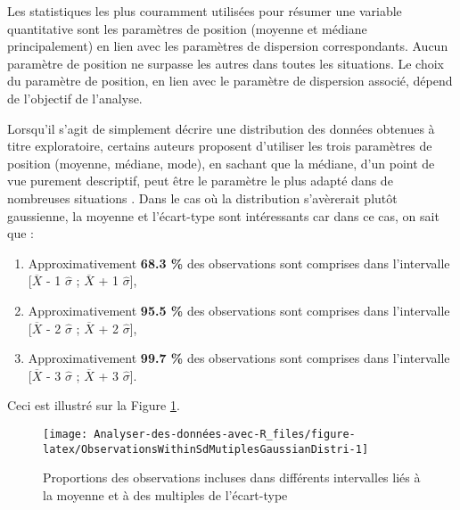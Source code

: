 \documentclass[
  french,
]{book}
\providecommand{\tightlist}{%
  \setlength{\itemsep}{0pt}\setlength{\parskip}{0pt}}
\begin{document}
Les statistiques les plus couramment utilisées pour résumer une variable quantitative sont les paramètres de position (moyenne et médiane principalement) en lien avec les paramètres de dispersion correspondants. Aucun paramètre de position ne surpasse les autres dans toutes les situations. Le choix du paramètre de position, en lien avec le paramètre de dispersion associé, dépend de l'objectif de l'analyse.

Lorsqu'il s'agit de simplement décrire une distribution des données obtenues à titre exploratoire, certains auteurs proposent d'utiliser les trois paramètres de position (moyenne, médiane, mode), en sachant que la médiane, d'un point de vue purement descriptif, peut être le paramètre le plus adapté dans de nombreuses situations \autocite{gonzalesMeasuresCentralTendency2001}. Dans le cas où la distribution s'avèrerait plutôt gaussienne, la moyenne et l'écart-type sont intéressants car dans ce cas, on sait que :

\begin{enumerate}
\def\labelenumi{\arabic{enumi}.}
\tightlist
\item
  Approximativement \textbf{68.3 \%} des observations sont comprises dans l'intervalle {[}\(\overline{X}\) - 1 \(\hat{\sigma}\) ; \(\overline{X}\) + 1 \(\hat{\sigma}\){]},
\item
  Approximativement \textbf{95.5 \%} des observations sont comprises dans l'intervalle {[}\(\overline{X}\) - 2 \(\hat{\sigma}\) ; \(\overline{X}\) + 2 \(\hat{\sigma}\){]},
\item
  Approximativement \textbf{99.7 \%} des observations sont comprises dans l'intervalle {[}\(\overline{X}\) - 3 \(\hat{\sigma}\) ; \(\overline{X}\) + 3 \(\hat{\sigma}\){]}.
\end{enumerate}

Ceci est illustré sur la Figure \ref{fig:ObservationsWithinSdMutiplesGaussianDistri}.

\begin{figure}

{\centering \texttt{[image: Analyser-des-données-avec-R\_files/figure-latex/ObservationsWithinSdMutiplesGaussianDistri-1]} 

}

\caption{Proportions des observations incluses dans différents intervalles liés à la moyenne et à des multiples de l'écart-type}\label{fig:ObservationsWithinSdMutiplesGaussianDistri}
\end{figure}
\end{document}
